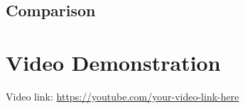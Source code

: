 \documentclass[11pt,a4paper]{article}
\begin{document}
\subsection{Comparison}




\section*{Video Demonstration}
Video link: \url{https://youtube.com/your-video-link-here}
\end{document}
